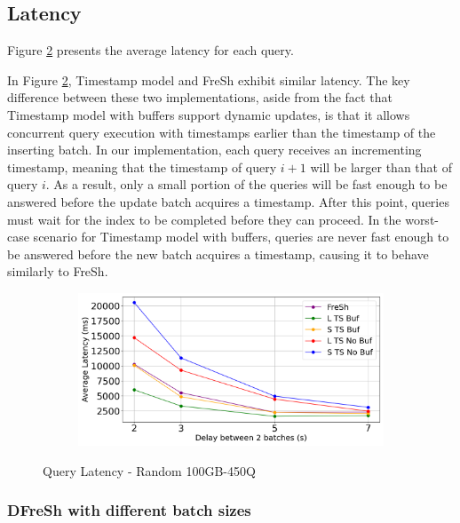 \subsection{Latency}

Figure \ref{fig:latency-random} presents the average latency for each query. 

In Figure \ref{fig:latency-random}, Timestamp model and FreSh exhibit similar latency. 
The key difference between these two implementations, aside from the fact that Timestamp model with buffers 
support dynamic updates, is that it allows concurrent query execution with timestamps 
earlier than the timestamp of the inserting batch. In our implementation, each query receives 
an incrementing timestamp, meaning that the timestamp of query $i+1$ will be larger than that 
of query $i$. As a result, only a small portion of the queries will be fast enough to be answered
before the update batch acquires a timestamp. After this point, queries must wait for the index to 
be completed before they can proceed. In the worst-case scenario for Timestamp model with buffers, queries 
are never fast enough to be answered before the new batch acquires a timestamp, causing it to 
behave similarly to FreSh.

\begin{figure}
	\centering
	\begin{subfigure}[c]{0.6\textwidth}
		\includegraphics[width=1\textwidth]   {figures/Experiments/Dynamic/Latency/average_latency.png}
		\label{fig:average-latency}
	\end{subfigure}
	\caption{Query Latency - Random 100GB-450Q}
	\label{fig:latency-random}
\end{figure}

\subsubsection{DFreSh with different batch sizes}

